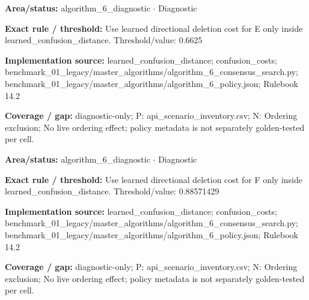 \begin{tcolorbox}[enhanced,breakable,colback=white,colframe=Muted!45,boxrule=0.45pt,arc=1.5pt,left=6pt,right=6pt,top=5pt,bottom=5pt,title={\texttt{A6-LEARNED-DELETION-E}},title after break={\texttt{A6-LEARNED-DELETION-E}\ (continued)},fonttitle=\headingfont\bfseries\color{Navy},coltitle=Navy]
\textbf{Area/status:} algorithm\_\allowbreak{}6\_\allowbreak{}diagnostic $\boldsymbol{\cdot}$ Diagnostic\par
\smallskip
\textbf{Exact rule / threshold:} Use learned directional deletion cost for E only inside learned\_\allowbreak{}confusion\_\allowbreak{}distance. Threshold/\allowbreak{}value: 0.6625\par
\smallskip
\textbf{Implementation source:} learned\_\allowbreak{}confusion\_\allowbreak{}distance; confusion\_\allowbreak{}costs; benchmark\_\allowbreak{}01\_\allowbreak{}legacy/\allowbreak{}master\_\allowbreak{}algorithms/\allowbreak{}algorithm\_\allowbreak{}6\_\allowbreak{}consensus\_\allowbreak{}search.py; benchmark\_\allowbreak{}01\_\allowbreak{}legacy/\allowbreak{}master\_\allowbreak{}algorithms/\allowbreak{}algorithm\_\allowbreak{}6\_\allowbreak{}policy.json; Rulebook 14.2\par
\smallskip
\textbf{Coverage / gap:} diagnostic-only; P: api\_\allowbreak{}scenario\_\allowbreak{}inventory.csv; N: Ordering exclusion; No live ordering effect; policy metadata is not separately golden-tested per cell.
\end{tcolorbox}
\begin{tcolorbox}[enhanced,breakable,colback=white,colframe=Muted!45,boxrule=0.45pt,arc=1.5pt,left=6pt,right=6pt,top=5pt,bottom=5pt,title={\texttt{A6-LEARNED-DELETION-F}},title after break={\texttt{A6-LEARNED-DELETION-F}\ (continued)},fonttitle=\headingfont\bfseries\color{Navy},coltitle=Navy]
\textbf{Area/status:} algorithm\_\allowbreak{}6\_\allowbreak{}diagnostic $\boldsymbol{\cdot}$ Diagnostic\par
\smallskip
\textbf{Exact rule / threshold:} Use learned directional deletion cost for F only inside learned\_\allowbreak{}confusion\_\allowbreak{}distance. Threshold/\allowbreak{}value: 0.88571429\par
\smallskip
\textbf{Implementation source:} learned\_\allowbreak{}confusion\_\allowbreak{}distance; confusion\_\allowbreak{}costs; benchmark\_\allowbreak{}01\_\allowbreak{}legacy/\allowbreak{}master\_\allowbreak{}algorithms/\allowbreak{}algorithm\_\allowbreak{}6\_\allowbreak{}consensus\_\allowbreak{}search.py; benchmark\_\allowbreak{}01\_\allowbreak{}legacy/\allowbreak{}master\_\allowbreak{}algorithms/\allowbreak{}algorithm\_\allowbreak{}6\_\allowbreak{}policy.json; Rulebook 14.2\par
\smallskip
\textbf{Coverage / gap:} diagnostic-only; P: api\_\allowbreak{}scenario\_\allowbreak{}inventory.csv; N: Ordering exclusion; No live ordering effect; policy metadata is not separately golden-tested per cell.
\end{tcolorbox}
